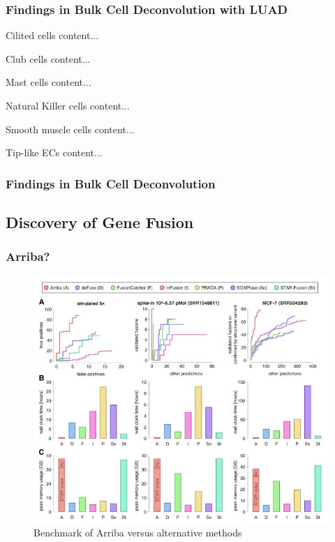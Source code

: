 \documentclass{beamer}
\begin{document}
    \begin{frame}[allowframebreaks]
        \frametitle{Findings in Bulk Cell Deconvolution with LUAD}

        \begin{block}{Cilited cells}
            content...
        \end{block}

        \begin{block}{Club cells}
            content...
        \end{block}

        \begin{block}{Mast cells}
            content...
        \end{block}

        \begin{block}{Natural Killer cells}
            content...
        \end{block}

        \begin{block}{Smooth muscle cells}
            content...
        \end{block}

        \begin{block}{Tip-like ECs}
            content...
        \end{block}
    \end{frame}

    \begin{frame}
        \frametitle{Findings in Bulk Cell Deconvolution}
    \end{frame}

    \subsection{Discovery of Gene Fusion}
    \begin{frame}
        \frametitle{Arriba?}

        \begin{figure}
            \includegraphics[width=0.6 \linewidth]{figures/Workflow/Arriba.png}
            \caption{Benchmark of Arriba versus alternative methods \protect\cite{Arriba1}}
        \end{figure}
    \end{frame}
\end{document}
